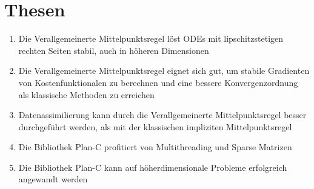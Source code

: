 \chapter{Thesen}
\begin{enumerate}
	\item Die Verallgemeinerte Mittelpunktsregel löst ODEs mit lipschitzstetigen rechten Seiten stabil, auch in höheren Dimensionen
	\item Die Verallgemeinerte Mittelpunktsregel eignet sich gut, um stabile Gradienten von Kostenfunktionalen zu berechnen und eine bessere Konvergenzordnung als klassische Methoden zu erreichen
	\item Datenassimilierung kann durch die Verallgemeinerte Mittelpunktsregel besser durchgeführt werden, als mit der klassischen impliziten Mittelpunktsregel
	\item Die Bibliothek Plan-C profitiert von Multithreading und Sparse Matrizen
	\item Die Bibliothek Plan-C kann auf höherdimensionale Probleme erfolgreich angewandt werden
\end{enumerate}